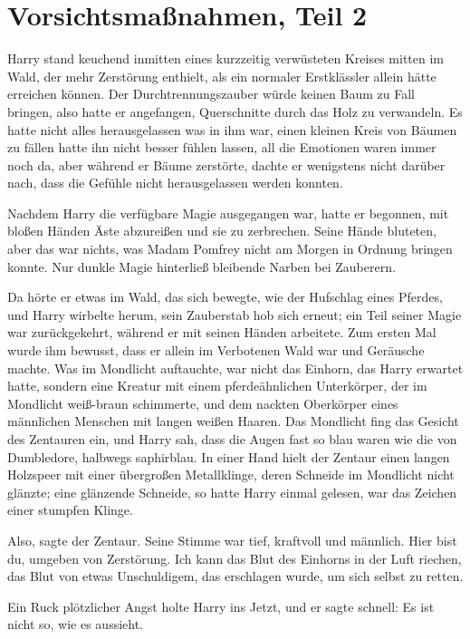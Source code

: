 \chapter{Vorsichtsmaßnahmen, Teil 2}

Harry stand keuchend inmitten eines kurzzeitig verwüsteten Kreises mitten im
Wald, der mehr Zerstörung enthielt, als ein normaler Erstklässler allein hätte
erreichen können. Der Durchtrennungszauber würde keinen Baum zu Fall bringen,
also hatte er angefangen, Querschnitte durch das Holz zu verwandeln. Es hatte
nicht alles herausgelassen was in ihm war, einen kleinen Kreis von Bäumen zu
fällen hatte ihn nicht besser fühlen lassen, all die Emotionen waren immer noch
da, aber während er Bäume zerstörte, dachte er wenigstens nicht darüber nach,
dass die Gefühle nicht herausgelassen werden konnten.

Nachdem Harry die verfügbare Magie ausgegangen war, hatte er begonnen, mit
bloßen Händen Äste abzureißen und sie zu zerbrechen. Seine Hände bluteten, aber
das war nichts, was Madam Pomfrey nicht am Morgen in Ordnung bringen konnte. Nur
dunkle Magie hinterließ bleibende Narben bei Zauberern.

Da hörte er etwas im Wald, das sich bewegte, wie der Hufschlag eines Pferdes,
und Harry wirbelte herum, sein Zauberstab hob sich erneut; ein Teil seiner Magie
war zurückgekehrt, während er mit seinen Händen arbeitete. Zum ersten Mal wurde
ihm bewusst, dass er allein im Verbotenen Wald war und Geräusche machte. Was im
Mondlicht auftauchte, war nicht das Einhorn, das Harry erwartet hatte, sondern
eine Kreatur mit einem pferdeähnlichen Unterkörper, der im Mondlicht weiß-braun
schimmerte, und dem nackten Oberkörper eines männlichen Menschen mit langen
weißen Haaren. Das Mondlicht fing das Gesicht des Zentauren ein, und Harry sah,
dass die Augen fast so blau waren wie die von Dumbledore, halbwegs saphirblau.
In einer Hand hielt der Zentaur einen langen Holzspeer mit einer übergroßen
Metallklinge, deren Schneide im Mondlicht nicht glänzte; eine glänzende
Schneide, so hatte Harry einmal gelesen, war das Zeichen einer stumpfen Klinge.

\glqq{}Also\grqq{}, sagte der Zentaur. Seine Stimme war tief, kraftvoll und
männlich. \glqq{}Hier bist du, umgeben von Zerstörung. Ich kann das Blut des
Einhorns in der Luft riechen, das Blut von etwas Unschuldigem, das erschlagen
wurde, um sich selbst zu retten.\grqq{}

Ein Ruck plötzlicher Angst holte Harry ins Jetzt, und er sagte schnell: \glqq{}Es
ist nicht so, wie es aussieht.\grqq{}

